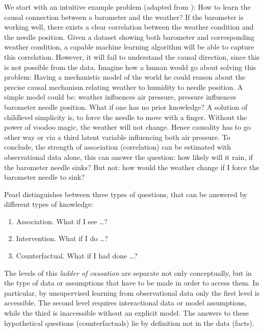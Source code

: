 		We start with an intuitive example problem (adapted from \cite{pearl18why}):
		How to learn the causal connection between a barometer and the weather? If the barometer is working well, there exists a clear correlation between the weather condition and the needle position. Given a dataset showing both barometer and corresponding weather condition, a capable machine learning algorithm will be able to capture this correlation. However, it will fail to understand the causal direction, since this is not possible from the data.
		Imagine how a human would go about solving this problem:
		Having a mechanistic model of the world he could reason about the precise causal mechanism relating weather to humidity to needle position. A simple model could be: weather influences air pressure, pressure influences barometer needle position.
		What if one has no prior knowledge? A solution of childlevel simplicity is, to force the needle to move with a finger. Without the power of voodoo magic, the weather will not change. Hence causality has to go other way or via a third latent variable influencing both \ie air pressure.
		To conclude, the strength of association (correlation) can be estimated with observational data alone, this can answer the question: how likely will it rain, if the barometer needle sinks? But not: how would the weather change if I force the barometer needle to sink?

		Pearl \cite{pearl18why} distinguishes between three types of questions, that can be answered by different types of knowledge:
		\begin{enumerate}
			\item Association. What if I see \ldots?
			\item Intervention. What if I do \ldots?
			\item Counterfactual. What if I had done \ldots?
		\end{enumerate}
		The levels of this \textit{ladder of causation} \cite{pearl18why} are separate not only conceptually, but in the type of data or assumptions that have to be made in order to access them. In particular, by unsupervised learning from observational data only the first level is accessible. The second level requires interactional data or model assumptions, while the third is inaccessible without an explicit model. The answers to these hypothetical questions (counterfactuals) lie by definition not in the data (facts).


